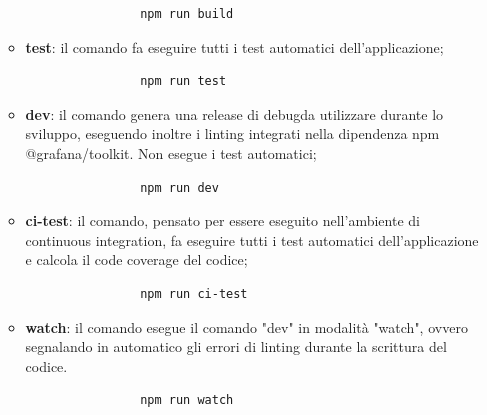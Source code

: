 \begin{itemize}
\begin{itemize}
\begin{verbatim}
				npm run build
			\end{verbatim}
			\item \textbf{test}: il comando fa eseguire tutti i test automatici dell'applicazione;
			\begin{verbatim}
				npm run test
			\end{verbatim}
			\item \textbf{dev}: il comando genera una release di debug\glosp da utilizzare durante lo sviluppo, eseguendo inoltre i linting integrati nella dipendenza npm @grafana/toolkit. Non esegue i test automatici;
			\begin{verbatim}
				npm run dev
			\end{verbatim}
			\item \textbf{ci-test}: il comando, pensato per essere eseguito nell'ambiente di continuous integration, fa eseguire tutti i test automatici dell'applicazione e calcola il code coverage del codice;
			\begin{verbatim}
				npm run ci-test
			\end{verbatim}
			\item \textbf{watch}: il comando esegue il comando "dev" in modalità "watch", ovvero segnalando in automatico gli errori di linting durante la scrittura del codice.
			\begin{verbatim}
				npm run watch
			\end{verbatim}
		\end{itemize}
\end{itemize}
